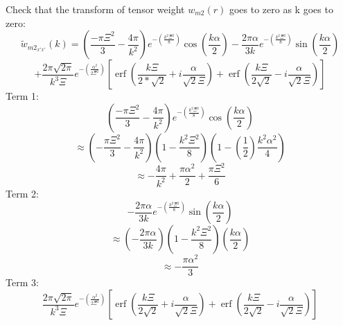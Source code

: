 \documentclass[12pt]{article}
\begin{document}
\[{}\]
\noindent Check that the transform of tensor weight ${w}_{m2}(r)$ goes to zero as k goes to zero:
\begin{displaymath}{\widetilde{w}_{{m2}_{x'x'}}(k)=\left(\frac{-\pi\Xi^2}{3}-\frac{4\pi}{k^2}\right)e^{-\left(\frac{k^2\Xi^2}{8}\right)}\cos(\frac{k\alpha}{2})-\frac{2\pi\alpha}{3k}e^{-\left(\frac{k^2\Xi^2}{8}\right)}\sin(\frac{k\alpha}{2})}\end{displaymath} 
\begin{equation}{+\frac{2\pi\sqrt{2\pi}}{k^3\Xi}e^{-\left(\frac{\alpha^2}{2\Xi^2}\right)}\left[\operatorname{erf}\left(\frac{k\Xi}{2*\sqrt{2}}+i\frac{\alpha}{\sqrt{2}\Xi}\right)+\operatorname{erf}\left(\frac{k\Xi}{2\sqrt{2}}-i\frac{\alpha}{\sqrt{2}\Xi}\right)\right]}\end{equation}
\[{}\]
Term 1: 
\begin{equation}{\left(\frac{-\pi\Xi^2}{3}-\frac{4\pi}{k^2}\right)e^{-\left(\frac{k^2\Xi^2}{8}\right)}\cos(\frac{k\alpha}{2})}\end{equation}
\begin{displaymath}{\approx\left(-\frac{\pi\Xi^2}{3}-\frac{4\pi}{k^2}\right)\left(1-\frac{k^2\Xi^2}{8}\right)\left(1-\left(\frac{1}{2}\right)\frac{k^2\alpha^2}{4}\right)}\end{displaymath} 
\begin{displaymath}{\approx-\frac{4\pi}{k^2}+\frac{\pi\alpha^2}{2}+\frac{\pi\Xi^2}{6}}\end{displaymath} 
\color{black}
Term 2:
\begin{equation}{-\frac{2\pi\alpha}{3k}e^{-\left(\frac{k^2\Xi^2}{8}\right)}\sin(\frac{k\alpha}{2})}\end{equation} 
\begin{displaymath}{\approx\left(-\frac{2\pi\alpha}{3k}\right)\left(1-\frac{k^2\Xi^2}{8}\right)\left(\frac{k\alpha}{2}\right)}\end{displaymath} 
\begin{displaymath}{\approx}-\frac{\pi\alpha^2}{3}\end{displaymath}
\color{black} 
Term 3:
\begin{equation}{\frac{2\pi\sqrt{2\pi}}{k^3\Xi}e^{-\left(\frac{\alpha^2}{2\Xi^2}\right)}\left[\operatorname{erf}\left(\frac{k\Xi}{2\sqrt{2}}+i\frac{\alpha}{\sqrt{2}\Xi}\right)+\operatorname{erf}\left(\frac{k\Xi}{2\sqrt{2}}-i\frac{\alpha}{\sqrt{2}\Xi}\right)\right]}\end{equation}
\end{document}
